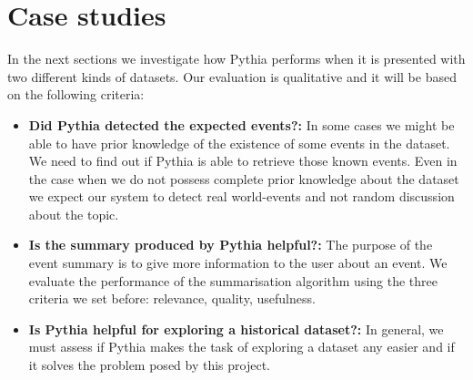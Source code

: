 \section{Case studies}
In the next sections we investigate how Pythia performs when it is presented with two different kinds of datasets. Our evaluation is qualitative and it will be based on
the following criteria:
\begin{itemize}
  \item \textbf{Did Pythia detected the expected events?:} In some cases we might be able to have prior knowledge of the existence of some events in the dataset. We need to find out if Pythia is able to retrieve those known events. Even in the case when we do not possess complete prior knowledge about the dataset we expect our system to detect real world-events and not random discussion about the topic. 
  \item \textbf{Is the summary produced by Pythia helpful?:} The purpose of the event summary is to give more information to the user about an event. We evaluate the performance of the summarisation algorithm using the three criteria we set before: relevance, quality, usefulness. 
  \item \textbf{Is Pythia helpful for exploring a historical dataset?:} In general, we must assess if Pythia makes the task of exploring a dataset any easier and if it solves the problem posed by this project.
\end{itemize}\vspace{15pt}

